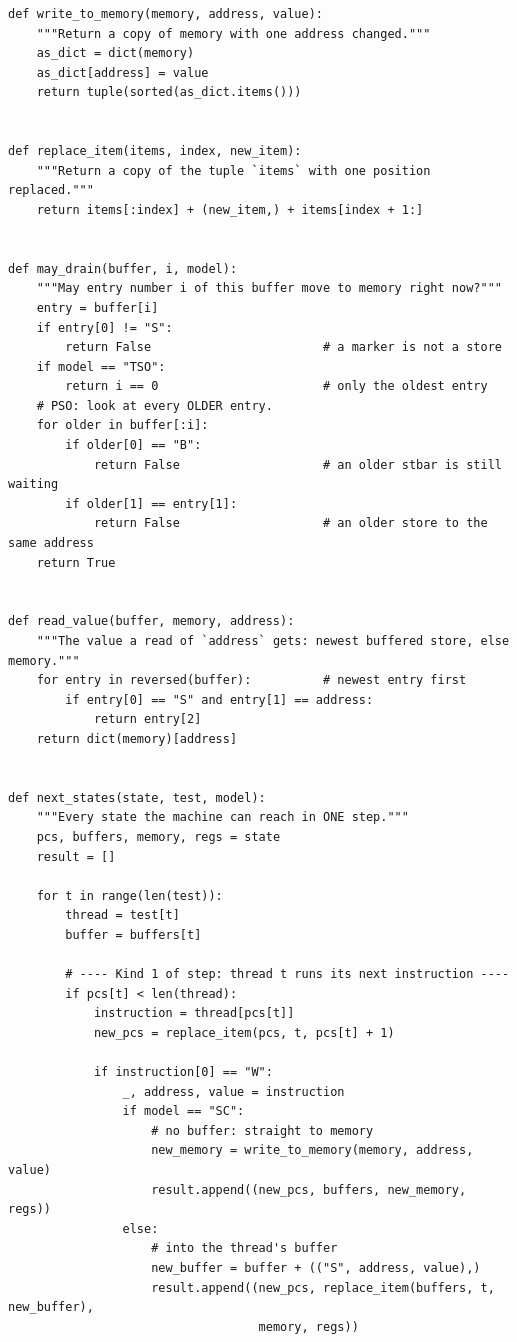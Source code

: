 \begin{lstlisting}[style=vspython]
def write_to_memory(memory, address, value):
    """Return a copy of memory with one address changed."""
    as_dict = dict(memory)
    as_dict[address] = value
    return tuple(sorted(as_dict.items()))


def replace_item(items, index, new_item):
    """Return a copy of the tuple `items` with one position replaced."""
    return items[:index] + (new_item,) + items[index + 1:]


def may_drain(buffer, i, model):
    """May entry number i of this buffer move to memory right now?"""
    entry = buffer[i]
    if entry[0] != "S":
        return False                        # a marker is not a store
    if model == "TSO":
        return i == 0                       # only the oldest entry
    # PSO: look at every OLDER entry.
    for older in buffer[:i]:
        if older[0] == "B":
            return False                    # an older stbar is still waiting
        if older[1] == entry[1]:
            return False                    # an older store to the same address
    return True


def read_value(buffer, memory, address):
    """The value a read of `address` gets: newest buffered store, else memory."""
    for entry in reversed(buffer):          # newest entry first
        if entry[0] == "S" and entry[1] == address:
            return entry[2]
    return dict(memory)[address]


def next_states(state, test, model):
    """Every state the machine can reach in ONE step."""
    pcs, buffers, memory, regs = state
    result = []

    for t in range(len(test)):
        thread = test[t]
        buffer = buffers[t]

        # ---- Kind 1 of step: thread t runs its next instruction ----
        if pcs[t] < len(thread):
            instruction = thread[pcs[t]]
            new_pcs = replace_item(pcs, t, pcs[t] + 1)

            if instruction[0] == "W":
                _, address, value = instruction
                if model == "SC":
                    # no buffer: straight to memory
                    new_memory = write_to_memory(memory, address, value)
                    result.append((new_pcs, buffers, new_memory, regs))
                else:
                    # into the thread's buffer
                    new_buffer = buffer + (("S", address, value),)
                    result.append((new_pcs, replace_item(buffers, t, new_buffer),
                                   memory, regs))


\end{lstlisting}
